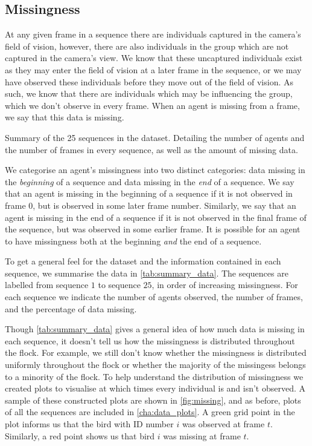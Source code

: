\subsection{Missingness}
\label{ssec:missingness}

At any given frame in a sequence there are individuals captured in the camera's field of vision, however, there are also individuals in the group which are not captured in the camera's view. We know that these uncaptured individuals exist as they may enter the field of vision at a later frame in the sequence, or we may have observed these individuals before they move out of the field of vision. As such, we know that there are individuals which may be influencing the group, which we don't observe in every frame. When an agent is missing from a frame, we say that this data is missing.

\begin{table}[!tbp]
	
		\caption{Summary of the 25 sequences in the dataset. Detailing the number of agents and the number
of frames in every sequence, as well as the amount of missing data.}
	\label{tab:summary_data}
\end{table}

We categorise an agent's missingness into two distinct categories: data missing in the \emph{beginning} of a sequence and data missing in the \emph{end} of a sequence. We say that an agent is missing in the beginning of a sequence if it is not observed in frame $0$, but is observed in some later frame number. Similarly, we say that an agent is missing in the end of a sequence if it is not observed in the final frame of the sequence, but was observed in some earlier frame. It is possible for an agent to have missingness both at the beginning \emph{and} the end of a sequence.

To get a general feel for the dataset and the information contained in each sequence, we summarise the data in \cref{tab:summary_data}. The sequences are labelled from sequence $1$ to sequence $25$, in order of increasing missingness. For each sequence we indicate the number of agents observed, the number of frames, and the percentage of data missing.

Though \cref{tab:summary_data} gives a general idea of how much data is missing in each sequence, it doesn't tell us how the missingness is distributed throughout the flock. For example, we still don't know whether the missingness is distributed uniformly throughout the flock or whether the majority of the missingess belongs to a minority of the flock. To help understand the distribution of missingness we created plots to visualise at which times every individual is and isn't observed. A sample of these constructed plots are shown in \cref{fig:missing}, and as before, plots of all the sequences are included in \cref{cha:data_plots}. A green grid point in the plot informs us that the bird with ID number $i$ was observed at frame $t$. Similarly, a red point shows us that bird $i$ was missing at frame $t$.

